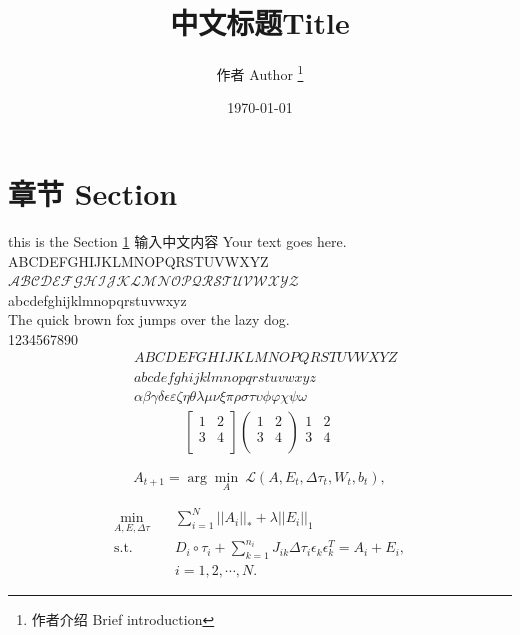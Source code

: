 \documentclass[UTF8,a4paper,10pt, twocolumn]{ctexart}
\title{中文标题Title}
\author{ 作者 Author \thanks{作者介绍 Brief introduction} }
\date{\today}
\begin{document}
	\maketitle
	\thispagestyle{fancy}
	
\section{章节 Section} \label{sec:one}
	this is the Section \ref{sec:one}
	输入中文内容 Your text goes here. \\
	ABCDEFGHIJKLMNOPQRSTUVWXYZ \\
	$\mathcal{ABCDEFGHIJKLMNOPQRSTUVWXYZ}$ \\
	abcdefghijklmnopqrstuvwxyz \\
	The quick brown fox jumps over the lazy dog.\\
	1234567890
	\begin{align}
		& ABCDEFGHIJKLMNOPQRSTUVWXYZ \label{eq:alphabet} \\
		& abcdefghijklmnopqrstuvwxyz \\
	& \alpha \beta \gamma \delta \epsilon \varepsilon \zeta \eta \theta \lambda \mu \nu \xi \pi \rho \sigma \tau \upsilon \phi \varphi \chi \psi \omega  
	\end{align}
	\begin{align}
	 \begin{bmatrix}
		1 & 2 \\
		3 & 4 \\
	\end{bmatrix}
	 \begin{pmatrix}
	1 & 2 \\
	3 & 4 \\
	\end{pmatrix}
	 \begin{matrix}
	1 & 2 \\
	3 & 4 \\
	\end{matrix}
	\end{align}
	
	\begin{equation}
	A_{t+1} = \arg\min_A \ \mathcal{L}(A,E_t,\Delta\tau_t,W_t,b_t), \nonumber
	\end{equation}
	
	\begin{equation}
	\begin{aligned} \label{eq:rasl}
	\min_{A,E,\Delta \tau} \quad & \sum_{i=1}^{N}||A_i||_* + \lambda ||E_i||_1  \\
	\mathrm{s.t.} \quad & D_i \circ \tau_i + \sum_{k=1}^{n_i} J_{ik} \Delta \tau_i \epsilon_k \epsilon_k^T = A_i + E_i, \\
	& i = 1,2,\cdots,N. 
	\end{aligned}
	\end{equation}
	
\end{document}
